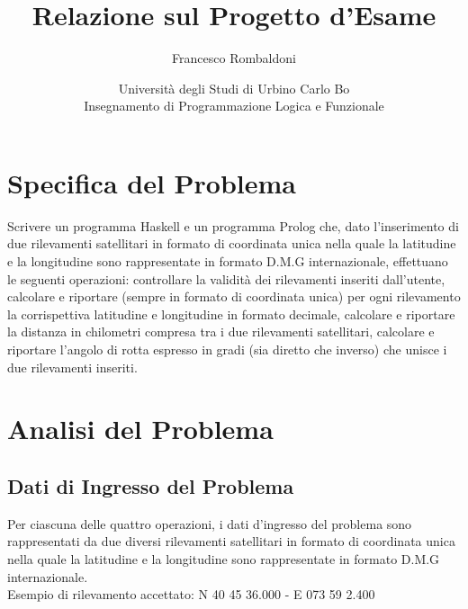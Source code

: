 \documentclass{article}
\title{\textbf{Relazione sul Progetto d'Esame}}
\author{Francesco Rombaldoni}
\date{\small Università degli Studi di Urbino Carlo Bo\\
	Insegnamento di Programmazione Logica e Funzionale}
\begin{document}
	\maketitle
	
	
\newpage

\section{Specifica del Problema}
Scrivere un programma Haskell e un programma Prolog che, dato l'inserimento di due rilevamenti satellitari in formato di coordinata unica nella quale la latitudine e la longitudine sono rappresentate in formato D.M.G internazionale, effettuano le seguenti operazioni: controllare la validità dei rilevamenti inseriti dall'utente, calcolare e riportare (sempre in formato di coordinata unica) per ogni rilevamento la corrispettiva latitudine e longitudine in formato decimale, calcolare e riportare la distanza in chilometri compresa tra i due rilevamenti satellitari, calcolare e riportare l'angolo di rotta espresso in gradi (sia diretto che inverso) che unisce i due rilevamenti inseriti.
\newline
\newline
\newpage
			
\section{Analisi del Problema}
\subsection{Dati di Ingresso del Problema}
Per ciascuna delle quattro operazioni, i dati d'ingresso del problema sono rappresentati da due diversi rilevamenti satellitari in formato di coordinata unica nella quale la latitudine e la longitudine sono rappresentate in formato D.M.G internazionale. \\
Esempio di rilevamento accettato: N 40 45 36.000 - E 073 59 2.400
\end{document}
